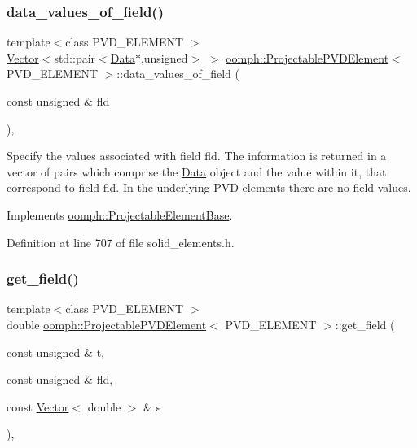 \subsubsection{\texorpdfstring{data\+\_\+values\+\_\+of\+\_\+field()}{data\_values\_of\_field()}}
{\footnotesize\ttfamily template$<$class P\+V\+D\+\_\+\+E\+L\+E\+M\+E\+NT $>$ \\
\hyperlink{classoomph_1_1Vector}{Vector}$<$std\+::pair$<$\hyperlink{classoomph_1_1Data}{Data}$\ast$,unsigned$>$ $>$ \hyperlink{classoomph_1_1ProjectablePVDElement}{oomph\+::\+Projectable\+P\+V\+D\+Element}$<$ P\+V\+D\+\_\+\+E\+L\+E\+M\+E\+NT $>$\+::data\+\_\+values\+\_\+of\+\_\+field (\begin{DoxyParamCaption}\item[{const unsigned \&}]{fld }\end{DoxyParamCaption})\hspace{0.3cm}{\ttfamily [inline]}, {\ttfamily [virtual]}}



Specify the values associated with field fld. The information is returned in a vector of pairs which comprise the \hyperlink{classoomph_1_1Data}{Data} object and the value within it, that correspond to field fld. In the underlying P\+VD elements there are no field values. 



Implements \hyperlink{classoomph_1_1ProjectableElementBase_a644306ebdf16f334344c2d27d72f18b7}{oomph\+::\+Projectable\+Element\+Base}.



Definition at line 707 of file solid\+\_\+elements.\+h.

\mbox{\label{classoomph_1_1ProjectablePVDElement_a4a193dadf4194ff1967c0e955b8b7666}} 
\subsubsection{\texorpdfstring{get\+\_\+field()}{get\_field()}}
{\footnotesize\ttfamily template$<$class P\+V\+D\+\_\+\+E\+L\+E\+M\+E\+NT $>$ \\
double \hyperlink{classoomph_1_1ProjectablePVDElement}{oomph\+::\+Projectable\+P\+V\+D\+Element}$<$ P\+V\+D\+\_\+\+E\+L\+E\+M\+E\+NT $>$\+::get\+\_\+field (\begin{DoxyParamCaption}\item[{const unsigned \&}]{t,  }\item[{const unsigned \&}]{fld,  }\item[{const \hyperlink{classoomph_1_1Vector}{Vector}$<$ double $>$ \&}]{s }\end{DoxyParamCaption})\hspace{0.3cm}{\ttfamily [inline]}, {\ttfamily [virtual]}}



